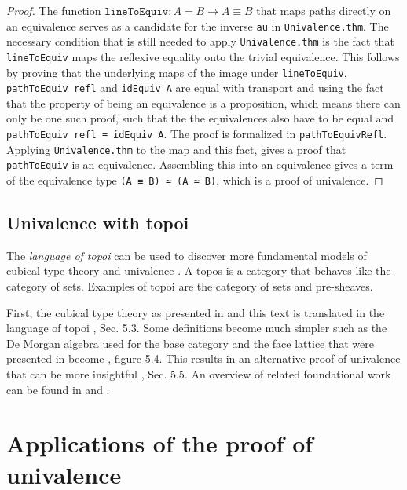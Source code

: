 \documentclass[12pt,a4paper,twoside,xetex]{book} %
\newcommand{\keyword}[1]{\emph{#1}\index{#1}}
\newcommand{\op}[1]{\mathtt{#1}}
\begin{document}
\begin{proof}
The function $\op{lineToEquiv} : A = B \rightarrow A \equiv B$ that maps paths 
directly on an equivalence serves as a candidate for the inverse \texttt{au} in 
\texttt{Univalence.thm}. The necessary condition that is still needed to apply 
\texttt{Univalence.thm} is the fact that \texttt{lineToEquiv} maps the 
reflexive equality onto the trivial equivalence. This follows by proving that 
the underlying maps of the image under \texttt{lineToEquiv}, 
\texttt{pathToEquiv refl} and \texttt{idEquiv A} are equal with transport and 
using the fact that the property of being an equivalence is a proposition, 
which means there can only be one such proof, such that the the equivalences 
also have to be equal and \texttt{pathToEquiv refl ≡ idEquiv A}. The proof is 
formalized in \texttt{pathToEquivRefl}. Applying \texttt{Univalence.thm} to the 
map and this fact, gives a proof that \texttt{pathToEquiv} is an equivalence. 
Assembling this into an equivalence gives a term of the equivalence type 
\texttt{(A ≡ B) ≃ (A ≃ B)}, which is a proof of univalence.
\end{proof}

\subsection{Univalence with topoi}

The \keyword{language of topoi} can be used to discover more fundamental 
models of cubical type theory and univalence \cite{Orton2019}. A topos is a 
category that behaves like the category of sets. Examples of topoi are the 
category of sets and pre-sheaves. 

First, the cubical type theory as presented in \cite{Huber2016} and this text 
is translated in the  language of topoi \cite{Orton2019}, Sec. 5.3. Some 
definitions become much simpler such as the De Morgan algebra used for the base 
category and the face lattice that were presented in  become 
\cite{Orton2019}, figure 5.4. This results in an alternative proof of 
univalence that can be more insightful \cite{Orton2019}, Sec. 5.5. An 
overview of related foundational work can be found in \cite{Pitts2018} and 
\cite{Licata2018}.


\section{Applications of the proof of univalence} \label{applications}
\end{document}
